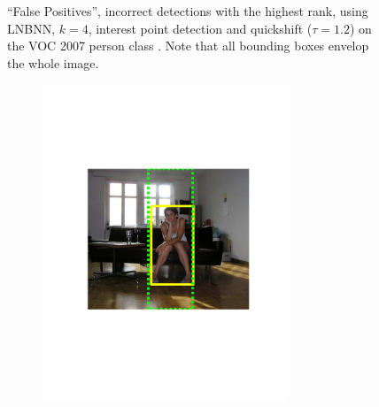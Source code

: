 \begin{figure}[hbt]
\begin{subfigure}[b]{0.37\textwidth}
        \caption{}
        \label{fig:detfp4}
    \end{subfigure}
    \caption{``False Positives'', incorrect detections with the highest rank, using LNBNN, $k=4$, interest point detection and quickshift ($\tau=1.2$) on the VOC 2007 person class \cite{pascal-voc-2007}. Note that all bounding boxes envelop the whole image.}
    \label{fig:detfp}
\end{figure}

\begin{figure}[hbt]
    \centering
    \begin{subfigure}[b]{0.37\textwidth}
        \centering
        \includegraphics[width=0.8\textwidth]{TP31116}
        \caption{}
        \label{fig:dettn1}
    \end{subfigure}
    ~
    \begin{subfigure}[b]{0.37\textwidth}
        \centering

\end{subfigure}
\end{figure}
